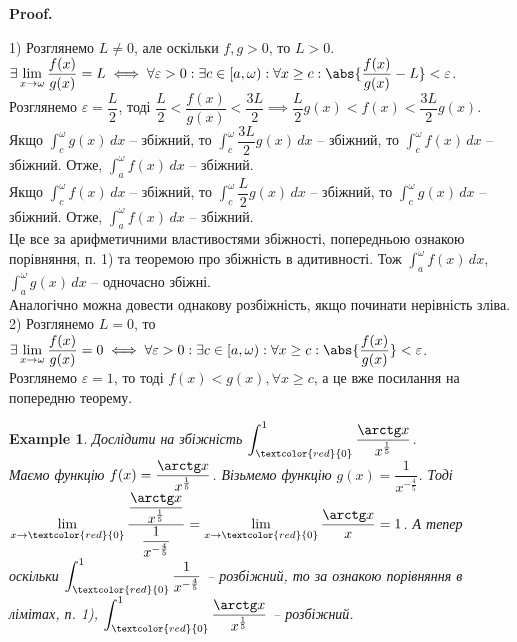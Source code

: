 \documentclass[a4paper, 10pt]{article}
\makeatletter
\def\huge{\displaystyle}
\theoremstyle{theoremdd}
\theoremstyle{theoremdd}
\theoremstyle{theoremdd}
\theoremstyle{theoremdd}
\theoremstyle{theoremdd}
\newtheorem{example}[theorem]{Example}
\theoremstyle{theoremdd}
\theoremstyle{theoremdd}
\theoremstyle{theoremdd}
\theoremstyle{theoremdd}
\renewenvironment{proof}[1][Proof.\\]{\par
\pushQED{\hfill \qed}%
\normalfont \topsep6\p@\@plus6\p@\relax
\trivlist
\item\relax
{\bfseries
#1\@addpunct{.}}\hspace\labelsep\ignorespaces
}{%
\popQED\endtrivlist\@endpefalse
}
\makeatother
\begin{document}
\begin{proof}
1) Розглянемо $L \neq 0$, але оскільки $f,g > 0$, то $L>0$.\\
$\exists \huge \lim_{x \to \omega} \dfrac{f(x)}{g(x)} = L \iff \forall \varepsilon > 0: \exists c \in [a,\omega): \forall x \geq c: \abs{\dfrac{f(x)}{g(x)} - L} < \varepsilon$.\\
Розглянемо $\varepsilon = \dfrac{L}{2}$, тоді $\dfrac{L}{2} < \dfrac{f(x)}{g(x)} < \dfrac{3L}{2} \implies \dfrac{L}{2}g(x) < f(x) < \dfrac{3L}{2}g(x)$.\\
Якщо $\huge\int_c^\omega g(x)\,dx$ -- збіжний, то $\huge\int_c^\omega \dfrac{3L}{2} g(x)\,dx$ -- збіжний, то $\huge\int_c^\omega f(x)\,dx$ -- збіжний. Отже, $\huge\int_a^\omega f(x)\,dx$ -- збіжний.\\
Якщо $\huge\int_c^\omega f(x)\,dx$ -- збіжний, то $\huge\int_c^\omega \dfrac{L}{2} g(x)\,dx$ -- збіжний, то $\huge\int_c^\omega g(x)\,dx$ -- збіжний. Отже, $\huge\int_a^\omega f(x)\,dx$ -- збіжний.\\
Це все за арифметичними властивостями збіжності, попередньою ознакою порівняння, п. 1) та теоремою про збіжність в адитивності. Тож $\huge\int_a^\omega f(x)\,dx$, $\huge\int_a^\omega g(x)\,dx$ -- одночасно збіжні.\\
Аналогічно можна довести однакову розбіжність, якщо починати нерівність зліва.
\bigskip \\
2) Розглянемо $L = 0$, то $\exists \huge \lim_{x \to \omega} \dfrac{f(x)}{g(x)} = 0 \iff \forall \varepsilon > 0: \exists c \in [a,\omega): \forall x \geq c: \abs{\dfrac{f(x)}{g(x)}} < \varepsilon$.\\
Розглянемо $\varepsilon = 1$, то тоді $f(x) < g(x), \forall x \geq c$, а це вже посилання на попередню теорему.
\end{proof}

\begin{example}
Дослідити на збіжність $\huge\int_{\textcolor{red}{0}}^{1} \dfrac{\arctg x}{x^{\frac{1}{5}}}$.\\
Маємо функцію $f(x) = \dfrac{\arctg x}{x^{\frac{1}{5}}}$. Візьмемо функцію $g(x) = \dfrac{1}{x^{-\frac{4}{5}}}$. Тоді $\huge \lim_{x \to \textcolor{red}{0}} \dfrac{\dfrac{\arctg x}{x^{\frac{1}{5}}}}{\dfrac{1}{x^{-\frac{4}{5}}}} = \lim_{x \to \textcolor{red}{0}} \dfrac{\arctg x}{x} = 1$. А тепер оскільки $\huge\int_{\textcolor{red}{0}}^{1} \dfrac{1}{x^{-\frac{4}{5}}}$ -- розбіжний, то за ознакою порівняння в лімітах, п. 1), $\huge\int_{\textcolor{red}{0}}^{1} \dfrac{\arctg x}{x^{\frac{1}{5}}}$ -- розбіжний.
\end{example}
\end{document}
